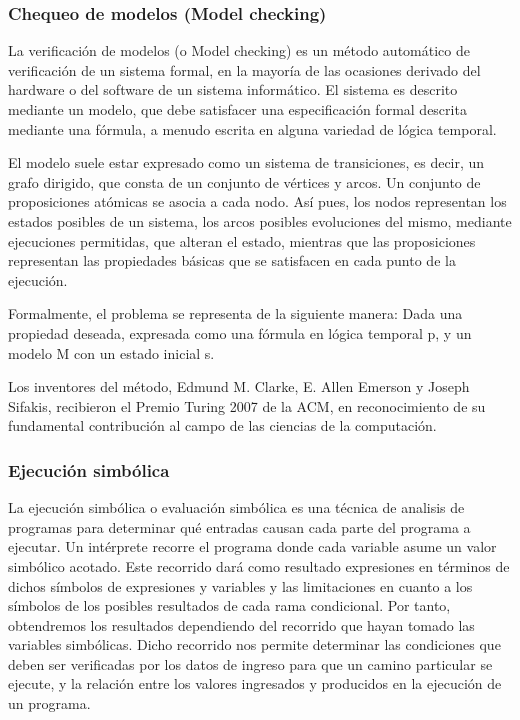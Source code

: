 \subsubsection*{Chequeo de modelos (Model checking)}

La verificaci\'on de modelos (o Model checking) es un m\'etodo autom\'atico de verificaci\'on de un sistema formal, en la mayor\'ia de las ocasiones derivado del hardware o del software de un sistema inform\'atico. El sistema es descrito mediante un modelo, que debe satisfacer una especificaci\'on formal descrita mediante una f\'ormula, a menudo escrita en alguna variedad de l\'ogica temporal.

El modelo suele estar expresado como un sistema de transiciones, es decir, un grafo dirigido, que consta de un conjunto de v\'ertices y arcos. Un conjunto de proposiciones at\'omicas se asocia a cada nodo. As\'i pues, los nodos representan los estados posibles de un sistema, los arcos posibles evoluciones del mismo, mediante ejecuciones permitidas, que alteran el estado, mientras que las proposiciones representan las propiedades b\'asicas que se satisfacen en cada punto de la ejecuci\'on.

Formalmente, el problema se representa de la siguiente manera: Dada una propiedad deseada, expresada como una f\'ormula en l\'ogica temporal p, y un modelo M con un estado inicial s.

Los inventores del m\'etodo, Edmund M. Clarke, E. Allen Emerson y Joseph Sifakis, recibieron el Premio Turing 2007 de la ACM, en reconocimiento de su fundamental contribuci\'on al campo de las ciencias de la computaci\'on.

\subsubsection*{Ejecuci\'on simb\'olica}

La ejecuci\'on simb\'olica o evaluaci\'on simb\'olica es una t\'ecnica de analisis de programas para determinar qu\'e entradas causan cada parte del programa a ejecutar. Un int\'erprete recorre el programa donde cada variable asume un valor simb\'olico acotado. Este recorrido dar\'a como resultado expresiones en t\'erminos de dichos s\'imbolos de expresiones y variables y las limitaciones en cuanto a los s\'imbolos de los posibles resultados de cada rama condicional. Por tanto, obtendremos los resultados dependiendo del recorrido que hayan tomado las variables simb\'olicas. Dicho recorrido nos permite determinar las condiciones que deben ser verificadas por los datos de ingreso para que un camino particular se ejecute, y la relaci\'on entre los valores ingresados y producidos en la ejecuci\'on de un programa.

